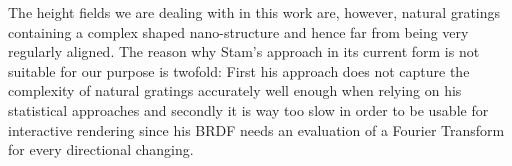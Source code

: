 The height fields we are dealing with in this work are, however, natural gratings containing a complex shaped nano-structure and hence far from being very regularly aligned. The reason why Stam's approach in its current form is not suitable for our purpose is twofold: First his approach does not capture the complexity of natural gratings accurately well enough when relying on his statistical approaches and secondly it is way too slow in order to be usable for interactive rendering since his BRDF needs an evaluation of a Fourier Transform for every directional changing. \\